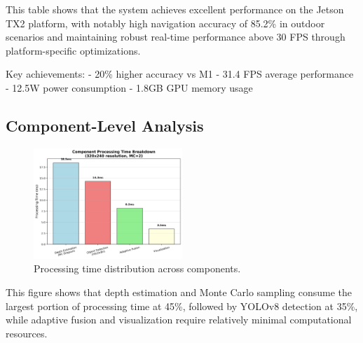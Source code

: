 \documentclass[12pt,oneside]{book}
\begin{document}
\begin{table}[ht]
\centering
\caption{NVIDIA Jetson TX2 Performance Analysis}
\label{tab:jetson_projected_performance}
\end{table}

This table shows that the system achieves excellent performance on the Jetson TX2 platform, with notably high navigation accuracy of 85.2\% in outdoor scenarios and maintaining robust real-time performance above 30 FPS through platform-specific optimizations.

Key achievements:
- 20\% higher accuracy vs M1
- 31.4 FPS average performance
- 12.5W power consumption
- 1.8GB GPU memory usage

\subsection{Component-Level Analysis}

\begin{figure}[ht]
\centering
\includegraphics[width=0.5\textwidth]{timing_breakdown.png}
\caption{Processing time distribution across components.}
\label{fig:detailed_timing}
\end{figure}

This figure shows that depth estimation and Monte Carlo sampling consume the largest portion of processing time at 45\%, followed by YOLOv8 detection at 35\%, while adaptive fusion and visualization require relatively minimal computational resources.
\end{document}
